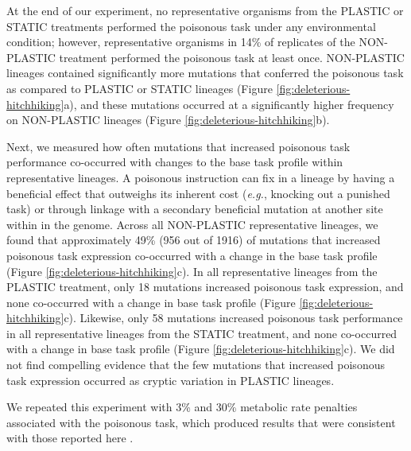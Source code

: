 

At the end of our experiment, no representative organisms from the PLASTIC or STATIC treatments performed the poisonous task under any environmental condition; however, representative organisms in 14\% of replicates of the NON-PLASTIC treatment performed the poisonous task at least once. 
NON-PLASTIC lineages contained significantly more mutations that conferred the poisonous task as compared to PLASTIC or STATIC lineages (Figure \ref{fig:deleterious-hitchhiking}a), and these mutations occurred at a significantly higher frequency on NON-PLASTIC lineages (Figure \ref{fig:deleterious-hitchhiking}b).

Next, we measured how often mutations that increased poisonous task performance co-occurred with changes to the base task profile within representative lineages.
A poisonous instruction can fix in a lineage by having a beneficial effect that outweighs its inherent cost (\textit{e.g.}, knocking out a punished task) or through linkage with a secondary beneficial mutation at another site within in the genome.
Across all NON-PLASTIC representative lineages, we found that approximately 49\% (956 out of 1916) of mutations that increased poisonous task expression co-occurred with a change in the base task profile (Figure \ref{fig:deleterious-hitchhiking}c).
In all representative lineages from the PLASTIC treatment, only 18 mutations increased poisonous task expression, and none co-occurred with a change in base task profile (Figure \ref{fig:deleterious-hitchhiking}c).
Likewise, only 58 mutations increased poisonous task performance in all representative lineages from the STATIC treatment, and none co-occurred with a change in base task profile (Figure \ref{fig:deleterious-hitchhiking}c).
We did not find compelling evidence that the few mutations that increased poisonous task expression occurred as cryptic variation in PLASTIC lineages.

We repeated this experiment with 3\% and 30\% metabolic rate penalties associated with the poisonous task, which produced results that were consistent with those reported here \citep{supplemental_material}.